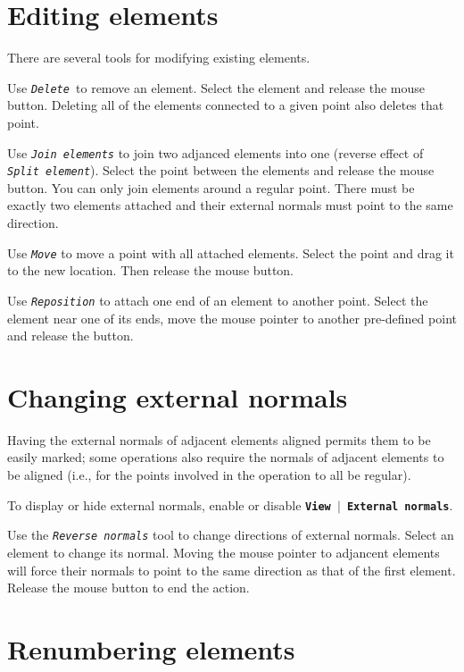 \documentclass[12pt]{report}
\begin{document}
\section{Editing elements}

There are several tools for modifying existing elements.

Use \textit{\texttt{Delete }}to remove an element. Select the element
and release the mouse button. Deleting all of the elements connected
to a given point also deletes that point.

Use \textit{\texttt{Join elements}} to join two adjanced elements into
one (reverse effect of \textit{\texttt{Split element}}). Select the
point between the elements and release the mouse button. You can only
join elements around a regular point. There must be exactly two
elements attached and their external normals must point to the same
direction.

Use \textit{\texttt{Move}} to move a point with all attached
elements. Select the point and drag it to the new location. Then
release the mouse button.

Use \textit{\texttt{Reposition}} to attach one end of an element to
another point. Select the element near one of its ends, move the mouse
pointer to another pre-defined point and release the button.

\section{Changing external normals}

Having the external normals of adjacent elements aligned permits them
to be easily marked; some operations also require the normals of
adjacent elements to be aligned (i.e., for the points involved in the
operation to 
all be regular). 

To display or hide external normals, enable or disable
\textbf{\texttt{View  \begin{math}\vert{}\end{math}  External normals}}.

Use the \textit{\texttt{Reverse normals}} tool to change directions of
external normals. Select an element to change its normal. Moving the
mouse pointer to adjancent elements will force their normals to point to
the same direction as that of the first element. Release the mouse
button to end the action.

\section{Renumbering elements}
\end{document}
